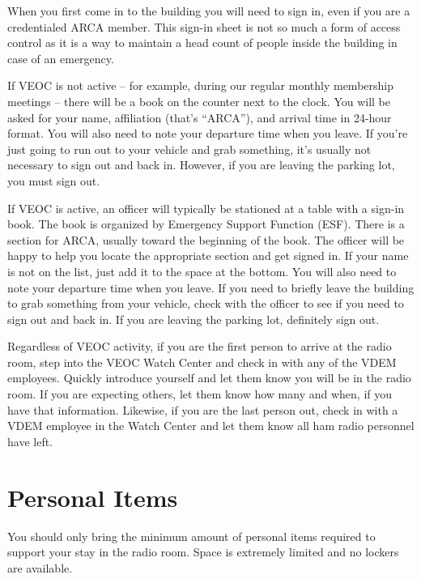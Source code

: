 \documentclass[pdflatex,letterpaper,twoside,12pt]{book}
\begin{document}
When you first come in to the building you will need to sign in, even if you are a credentialed ARCA member.  This sign-in sheet is not so much a form of access control as it is a way to maintain a head count of people inside the building in case of an emergency.

If VEOC is not active – for example, during our regular monthly membership meetings – there will be a book on the counter next to the clock.  You will be asked for your name, affiliation (that's ``ARCA''), and arrival time in 24-hour format.  You will also need to note your departure time when you leave.  If you're just going to run out to your vehicle and grab something, it's usually not necessary to sign out and back in.  However, if you are leaving the parking lot, you must sign out.

If VEOC is active, an officer will typically be stationed at a table with a sign-in book.  The book is organized by Emergency Support Function (ESF).  There is a section for ARCA, usually toward the beginning of the book.  The officer will be happy to help you locate the appropriate section and get signed in.  If your name is not on the list, just add it to the space at the bottom.  You will also need to note your departure time when you leave.  If you need to briefly leave the building to grab something from your vehicle, check with the officer to see if you need to sign out and back in.  If you are leaving the parking lot, definitely sign out.

Regardless of VEOC activity, if you are the first person to arrive at the radio room, step into the VEOC Watch Center and check in with any of the VDEM employees.  Quickly introduce yourself and let them know you will be in the radio room.  If you are expecting others, let them know how many and when, if you have that information.  Likewise, if you are the last person out, check in with a VDEM employee in the Watch Center and let them know all ham radio personnel have left.


\section{Personal Items}

You should only bring the minimum amount of personal items required to support your stay in the radio room.  Space is extremely limited and no lockers are available.
\end{document}
